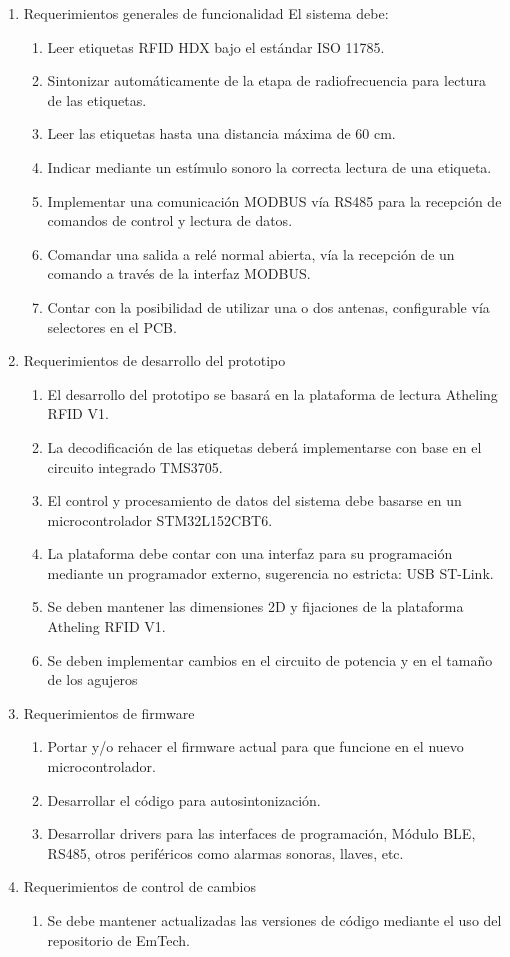 \documentclass[
11pt, %
]{charter}
\begin{document}
\begin{enumerate}
	\item Requerimientos generales de funcionalidad
	El sistema debe:
		\begin{enumerate}
			\item  Leer etiquetas RFID HDX bajo el estándar ISO 11785.
			\item  Sintonizar automáticamente de la etapa de radiofrecuencia para lectura de las etiquetas.
			\item  Leer las etiquetas hasta una distancia máxima de 60 cm.
			\item  Indicar mediante un estímulo sonoro la correcta lectura de una etiqueta.
			\item  Implementar una comunicación MODBUS vía RS485 para la recepción de comandos de control y lectura de datos.
			\item  Comandar una salida a relé normal abierta, vía la recepción de un comando a través de la interfaz MODBUS.
			\item  Contar con la posibilidad de utilizar una o dos antenas, configurable vía selectores en el PCB.

		\end{enumerate}
	\item Requerimientos de desarrollo del prototipo 
		\begin{enumerate}
			\item El desarrollo del prototipo se basará en la plataforma de lectura Atheling RFID V1.
			\item La decodificación de las etiquetas deberá implementarse con base en el circuito integrado TMS3705.
			\item El control y procesamiento de datos del sistema debe basarse en un microcontrolador STM32L152CBT6.
			\item La plataforma debe contar con una interfaz para su programación mediante un programador externo, sugerencia no estricta: USB ST-Link.
			\item Se deben mantener las dimensiones 2D y fijaciones de la plataforma Atheling RFID V1.
			\item Se deben implementar cambios en el circuito de potencia y en el tamaño de los agujeros
			
		\end{enumerate}
	\item Requerimientos de firmware
	\begin{enumerate}
			\item Portar y/o rehacer el firmware actual para que funcione en el nuevo microcontrolador. 
			\item Desarrollar el código para autosintonización.
			\item Desarrollar drivers para las interfaces de programación, Módulo BLE, RS485, otros periféricos como alarmas sonoras, llaves, etc.
			\end{enumerate}
	\item Requerimientos de control de cambios
	\begin{enumerate}
			\item Se debe mantener actualizadas las versiones de código mediante el uso del repositorio de EmTech.
			\end{enumerate}
	

\end{enumerate}
\end{document}
